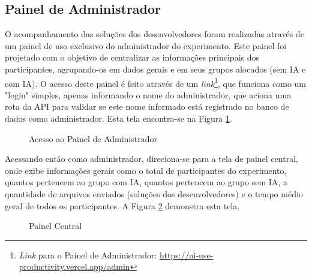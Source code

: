 \documentclass[english,brazilian]{UNISINOSartigo} %
\begin{document}
\subsection{Painel de Administrador}

O acompanhamento das soluções dos desenvolvedores foram realizadas através de um painel de uso exclusivo do administrador do experimento. Este painel foi projetado com o objetivo de centralizar as informações principais dos participantes, agrupando-os em dados gerais e em seus grupos alocados (sem IA e com IA). O acesso deste painel é feito através de um \textit{link}\footnote{\textit{Link} para o Painel de Administrador: \url{https://ai-use-productivity.vercel.app/admin}}, que funciona como um "login" simples, apenas informando o nome do administrador, que aciona uma rota da API para validar se este nome informado está registrado no banco de dados como administrador. Esta tela encontra-se na Figura \ref{fig:painel_admin}.

\begin{figure}[ht]
    \caption{Acesso ao Painel de Administrador}
    \label{fig:painel_admin}
    \centering
    \footnotesize
    \begin{minipage}{.9\textwidth}
        \centering
    \end{minipage}
\end{figure}
\FloatBarrier

Acessando então como administrador, direciona-se para a tela de painel central, onde exibe informações gerais como o total de participantes do experimento, quantos pertencem ao grupo com IA, quantos pertencem ao grupo sem IA, a quantidade de arquivos enviados (soluções dos desenvolvedores) e o tempo médio geral de todos os participantes. A Figura \ref{fig:painel_central_admin} demonstra esta tela.

\begin{figure}[ht]
    \caption{Painel Central}
    \label{fig:painel_central_admin}
    \centering
    \footnotesize
    \begin{minipage}{.9\textwidth}
        \centering
    \end{minipage}
\end{figure}
\FloatBarrier
\end{document}
